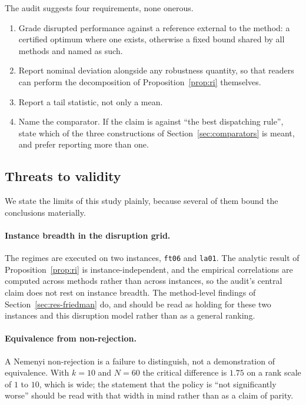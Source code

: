 \documentclass[a4paper,fleqn]{cas-sc}
\begin{document}
The audit suggests four requirements, none onerous.
\begin{enumerate}[(1)]
\item Grade disrupted performance against a reference external to the method:
a certified optimum where one exists, otherwise a fixed bound shared by all
methods and named as such.
\item Report nominal deviation alongside any robustness quantity, so that
readers can perform the decomposition of Proposition~\ref{prop:ri} themselves.
\item Report a tail statistic, not only a mean.
\item Name the comparator. If the claim is against ``the best dispatching
rule'', state which of the three constructions of
Section~\ref{sec:comparators} is meant, and prefer reporting more than one.
\end{enumerate}

\subsection{Threats to validity}\label{sec:threats}

We state the limits of this study plainly, because several of them bound the
conclusions materially.

\paragraph{Instance breadth in the disruption grid.} The \NRegimes{} regimes are
executed on two instances, \texttt{ft06} and \texttt{la01}. The analytic result
of Proposition~\ref{prop:ri} is instance-independent, and the empirical
correlations are computed across methods rather than across instances, so the
audit's central claim does not rest on instance breadth. The method-level
findings of Section~\ref{sec:res-friedman} do, and should be read as holding for
these two instances and this disruption model rather than as a general ranking.

\paragraph{Equivalence from non-rejection.} A Nemenyi non-rejection is a failure
to distinguish, not a demonstration of equivalence. With $k=10$ and $N=60$ the
critical difference is $1.75$ on a rank scale of $1$ to $10$, which is wide; the
statement that the policy is ``not significantly worse'' should be read with that
width in mind rather than as a claim of parity.
\end{document}
